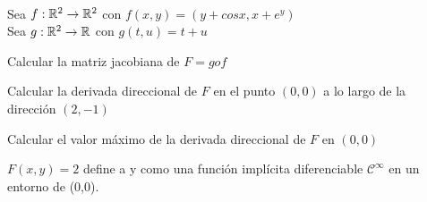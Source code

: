 \begin{ejer}\hfill\\
	Sea $f: \mathbb{R}^2 \to \mathbb{R}^2$ con $f(x,y) = (y+cosx,x+e^y)$\\
	Sea $g: \mathbb{R}^2 \to \mathbb{R}$ con $g(t,u) = t+u$
	\begin{nlist}
	\item Calcular la matriz jacobiana de $F=gof$
	\item Calcular la derivada direccional de $F$ en el punto $(0,0)$ a lo largo de la dirección $(2,-1)$
	\item Calcular el valor máximo de la derivada direccional de $F$ en $(0,0)$
	\item $F(x,y) = 2$ define a y como una función implícita diferenciable $\mathcal{C}^\infty$ en un entorno de (0,0).
\end{nlist}
\end{ejer}
